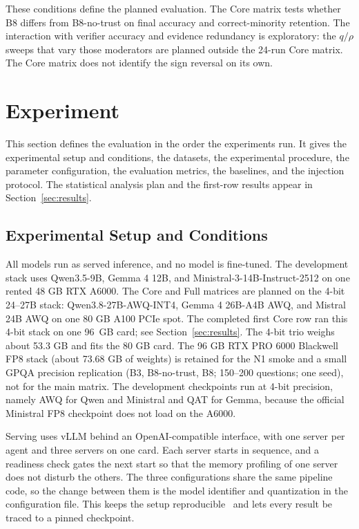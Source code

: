 \documentclass[a4paper,fleqn]{cas-sc}
\begin{document}
These conditions define the planned evaluation. The Core matrix tests whether B8 differs from B8-no-trust on final accuracy and correct-minority retention. The interaction with verifier accuracy and evidence redundancy is exploratory: the $q/\rho$ sweeps that vary those moderators are planned outside the 24-run Core matrix. The Core matrix does not identify the sign reversal on its own.

\clearpage

\section{Experiment}\label{sec4}

This section defines the evaluation in the order the experiments run. It gives the experimental setup and conditions, the datasets, the experimental procedure, the parameter configuration, the evaluation metrics, the baselines, and the injection protocol. The statistical analysis plan and the first-row results appear in Section~\ref{sec:results}.


\subsection{Experimental Setup and Conditions}

All models run as served inference, and no model is fine-tuned. The development stack uses Qwen3.5-9B, Gemma 4 12B, and Ministral-3-14B-Instruct-2512 on one rented 48 GB RTX A6000. The Core and Full matrices are planned on the 4-bit 24--27B stack: Qwen3.8-27B-AWQ-INT4, Gemma 4 26B-A4B AWQ, and Mistral 24B AWQ on one 80 GB A100 PCIe spot. The completed first Core row ran this 4-bit stack on one 96~GB card; see Section~\ref{sec:results}. The 4-bit trio weighs about 53.3 GB and fits the 80 GB card. The 96 GB RTX PRO 6000 Blackwell FP8 stack (about 73.68 GB of weights) is retained for the N1 smoke and a small GPQA precision replication (B3, B8-no-trust, B8; 150--200 questions; one seed), not for the main matrix. The development checkpoints run at 4-bit precision, namely AWQ for Qwen and Ministral and QAT for Gemma, because the official Ministral FP8 checkpoint does not load on the A6000.

Serving uses vLLM behind an OpenAI-compatible interface, with one server per agent and three servers on one card. Each server starts in sequence, and a readiness check gates the next start so that the memory profiling of one server does not disturb the others. The three configurations share the same pipeline code, so the change between them is the model identifier and quantization in the configuration file. This keeps the setup reproducible~\cite{pineau2021improving} and lets every result be traced to a pinned checkpoint.
\end{document}
